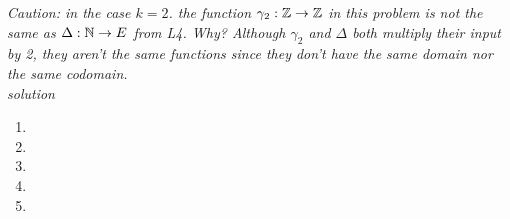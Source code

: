 \documentclass[11pt,twoside]{amsart}
\theoremstyle{definition}
\begin{document}
\textit{Caution: in the case $k = 2$. the function $\gamma_2 : \operatorname*{\mathbb{Z}} \to \operatorname*{\mathbb{Z}}$ in this problem is not the same as $\Delta : \operatorname*{\mathbb{N}} \to E$ from L4. Why? Although $\gamma_2$ and $\Delta$ both multiply their input by 2, they aren't the same functions since they don't have the same domain nor the same codomain.} \medskip \\
\emph{solution}
    \begin{enumerate}[label= 1.\arabic*, itemsep=0.4cm]
        \item %
        \item %
        \item %

        \item %
        \item %


    \end{enumerate}
\end{document}

